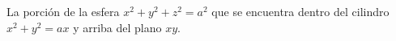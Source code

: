 \item La porción de la esfera $x^2 + y^2 + z^2 = a^2$ que se encuentra dentro del cilindro $x^2 + y^2 = ax$ y arriba del plano $xy$.
